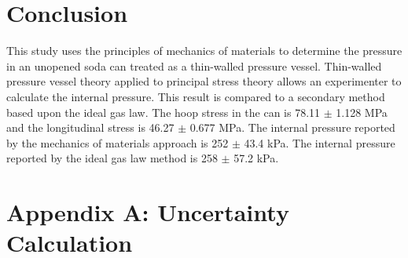 \documentclass[10pt,journal,letterpaper]{IEEEtran}
\begin{document}
\section{Conclusion}

This study uses the principles of mechanics of materials to determine the pressure in an unopened soda can treated as a thin-walled pressure vessel.
Thin-walled pressure vessel theory applied to principal stress theory allows an experimenter to calculate the internal pressure.
This result is compared to a secondary method based upon the ideal gas law.
The hoop stress in the can is 78.11 $\pm$ 1.128 MPa and the longitudinal stress is 46.27 $\pm$ 0.677 MPa.
The internal pressure reported by the mechanics of materials approach is 252 $\pm$ 43.4 kPa. The internal pressure reported by the ideal gas law method is 258 $\pm$ 57.2 kPa.

\section*{Appendix A: Uncertainty Calculation}
\end{document}
